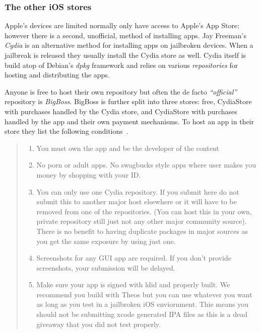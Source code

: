 \documentclass[thesis.tex]{subfiles}
\begin{document}
\subsubsection{The other iOS stores}

Apple's devices are limited normally only have access to Apple's App Store; however there is a second, unofficial, method of installing apps.
Jay Freeman's \emph{Cydia} is an alternative method for installing apps on jailbroken devices.
When a jailbreak is released they usually install the Cydia store as well.
Cydia itself is build atop of Debian's \emph{dpkg} framework and relies on various \emph{repositories} for hosting and distributing the apps.

Anyone is free to host their own repository but often the de facto \emph{``official''} repository is \emph{BigBoss}.
BigBoss is further split into three stores: free, CydiaStore with purchases handled by the Cydia store, and CydiaStore with purchases handled by the app and their own payment mechanisms.  To host an app in their store they list the following conditions~\cite{bigboss_host_2014}.

\begin{quotation}
  \begin{enumerate}
    \item You must own the app and be the developer of the content

    \item No porn or adult apps. No swagbucks style apps where user makes you money by shopping with your ID.

    \item You can only use one Cydia repository. If you submit here do not submit this to another major host elsewhere or it will have to be removed from one of the repositories. (You can host this in your own, private repository still just not any other major community source). There is no benefit to having duplicate packages in major sources as you get the same exposure by using just one.

    \item Screenshots for any GUI app are required. If you don’t provide screenshots, your submission will be delayed.

    \item Make sure your app is signed with ldid and properly built. We recommend you build with Theos but you can use whatever you want as long as you test in a jailbroken iOS enviornment. Thie means you should not be submitting xcode generated IPA files as this is a dead giveaway that you did not test properly.
  \end{enumerate}
\end{quotation}
\end{document}

